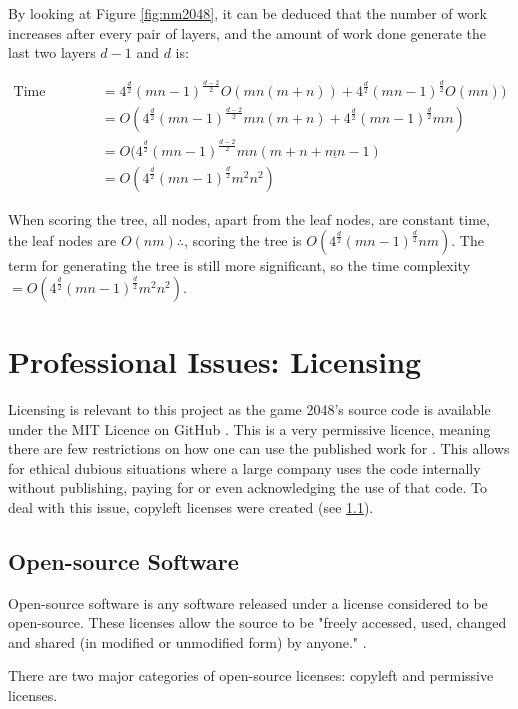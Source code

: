 \documentclass{article}
\begin{document}
By looking at Figure \ref{fig:nm2048}, it can be deduced that the number of work increases after every pair of layers, and the amount of work done generate the last two layers $d - 1$ and $d$ is: 

\begin{align}
\text{Time Complexity} & = 4^\frac{d}{2}(mn - 1)^{\frac{d - 2}{2}}O(mn(m+n)) + 4^\frac{d}{2}(mn - 1)^{\frac{d}{2}}O(mn)) \\
 & = O(4^\frac{d}{2}(mn - 1)^\frac{d - 2}{2}mn(m+n) + 4^\frac{d}{2}(mn - 1)^\frac{d}{2}mn) \\
 & = O(4^\frac{d}{2}(mn - 1)^\frac{d - 2}{2}mn(m + n + \underline{mn} - 1) \\
 & = O(4^\frac{d}{2}(mn - 1)^\frac{d}{2}m^2n^2)
\end{align}

When scoring the tree, all nodes, apart from the leaf nodes, are constant time, the leaf nodes are $O(nm) \therefore$, scoring the tree is $O(4^\frac{d}{2}(mn - 1)^\frac{d}{2}nm)$.
The term for generating the tree is still more significant, so the time complexity $= O(4^\frac{d}{2}(mn - 1)^\frac{d}{2}m^2n^2)$.


\section{Professional Issues: Licensing}
\label{sec:prof_issues}
Licensing is relevant to this project as the game 2048's source code is available under the MIT Licence on GitHub \cite{source2048}. This is a very permissive licence, meaning there are few restrictions on how one can use the published work for \cite{osi_faq}. This allows for ethical dubious situations where a large company uses the code internally without publishing, paying for or even acknowledging the use of that code. To deal with this issue, copyleft licenses were created (see \ref{subsec:oss}).

\subsection{Open-source Software}
\label{subsec:oss}
Open-source software is any software released under a license considered to be open-source. These licenses allow the source to be "freely accessed, used, changed and shared (in modified or unmodified form) by anyone." \cite{osi_faq}.

There are two major categories of open-source licenses: copyleft and permissive licenses. 
\end{document}
